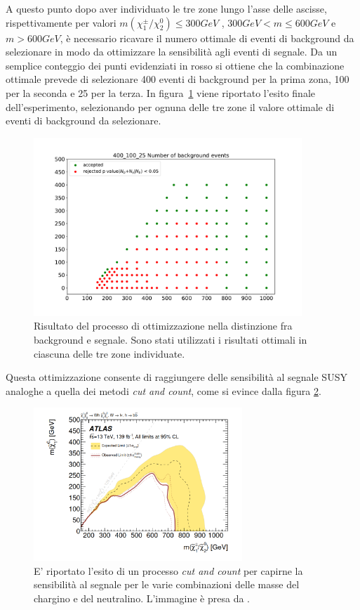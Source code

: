 A questo punto dopo aver individuato le tre zone lungo l'asse delle ascisse, rispettivamente per valori $ m(\chi^\pm_1/\chi^0_2) \le 300 GeV$ , $300 GeV < m \le 600 GeV$ e $m > 600 GeV$, è necessario ricavare il numero ottimale di eventi di background da selezionare in modo da ottimizzare la sensibilità agli eventi di segnale. Da un semplice conteggio dei punti evidenziati in rosso si ottiene che la combinazione ottimale prevede di selezionare 400 eventi di background per la prima zona, 100 per la seconda e 25 per la terza. In figura~\ref{mix} viene riportato l'esito finale dell'esperimento, selezionando per ognuna delle tre zone il valore ottimale di eventi di background da selezionare.

\begin{figure}[h!]
	\centering
	\includegraphics[width=0.90\textwidth]{figs/risultati_simulazione/mix.pdf}
	\caption{Risultato del processo di ottimizzazione nella distinzione fra background e segnale. Sono stati utilizzati i risultati ottimali in ciascuna delle tre zone individuate.}
	\label{mix}
\end{figure}

Questa ottimizzazione consente di raggiungere delle sensibilità al segnale SUSY analoghe a quella dei metodi \textit{cut and count}, come si evince dalla figura \ref{confronto}.

\newpage

\begin{figure}[h!]
	\centering
	\includegraphics[width=0.70\textwidth]{figs/risultati_simulazione/confronto.png}
	\caption{E' riportato l'esito di un processo \textit{cut and count} per capirne la sensibilità al segnale per le varie combinazioni delle masse del chargino e del neutralino. L'immagine è presa da \cite{susy_alberto}.}
	\label{confronto}
\end{figure}

